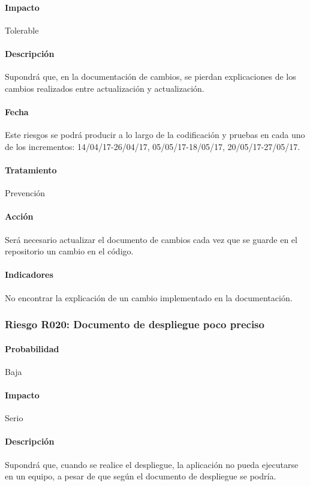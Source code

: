 \documentclass[10pt,a4paper]{article}
\begin{document}
				\paragraph{Impacto}	Tolerable
				\paragraph{Descripción} Supondrá que, en la documentación de cambios, se pierdan explicaciones de los cambios realizados entre actualización y actualización.
				\paragraph{Fecha} Este riesgos se podrá producir a lo largo de la codificación y pruebas en cada uno de los incrementos: 14/04/17-26/04/17, 05/05/17-18/05/17, 20/05/17-27/05/17.  %
				\paragraph{Tratamiento} Prevención %
				\paragraph{Acción} Será necesario actualizar el documento de cambios cada vez que se guarde en el repositorio un cambio en el código. %
				\paragraph{Indicadores} No encontrar la explicación de un cambio implementado en la documentación. %
			
			\subsubsection{Riesgo R020: Documento de despliegue poco preciso }
				\paragraph{Probabilidad} Baja
				\paragraph{Impacto}	Serio
				\paragraph{Descripción} Supondrá que, cuando se realice el despliegue, la aplicación no pueda ejecutarse en un equipo, a pesar de que según el documento de despliegue se podría.
\end{document}
